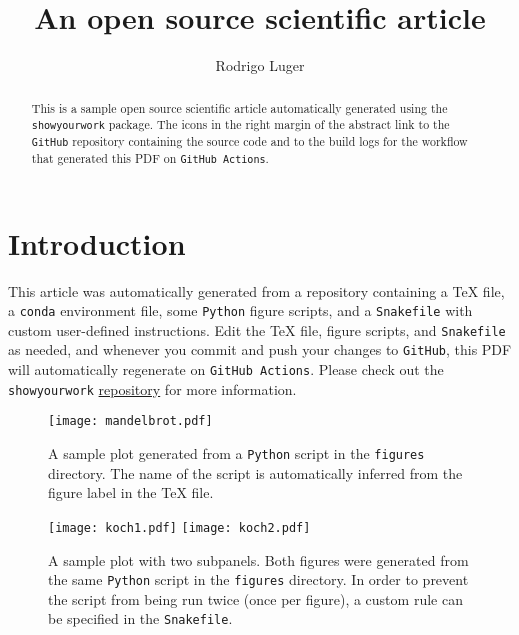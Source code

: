 \documentclass[twocolumn]{aastex631}
\begin{document}
\title{An open source scientific article}

\author{Rodrigo Luger}

\begin{abstract}
    This is a sample open source scientific article automatically generated using the \texttt{showyourwork} package.
    The icons in the right margin of the abstract link to the \texttt{GitHub} repository containing the source code and to the build logs for the workflow that generated this PDF on \texttt{GitHub Actions}.
\end{abstract}

\section{Introduction}
This article was automatically generated from a repository containing a TeX file,
a \texttt{conda} environment file, some \texttt{Python} figure scripts, and a \texttt{Snakefile} with custom user-defined instructions.
Edit the TeX file, figure scripts, and \texttt{Snakefile} as needed, and whenever you commit and push your changes to \texttt{GitHub}, this PDF will automatically regenerate on \texttt{GitHub Actions}. Please check out the \texttt{showyourwork} \href{https://github.com/rodluger/showyourwork}{repository} for more information.

\begin{figure}[ht!]
    \begin{centering}
        \texttt{[image: mandelbrot.pdf]}
        \caption{
            A sample plot generated from a \texttt{Python} script in the \texttt{figures} directory.
            The name of the script is automatically inferred from the figure label in the TeX file.
        }
        \label{fig:mandelbrot}
    \end{centering}
\end{figure}

\begin{figure}[ht!]
    \begin{centering}
        \texttt{[image: koch1.pdf]}
        \texttt{[image: koch2.pdf]}
        \caption{
            A sample plot with two subpanels.
            Both figures were generated from the same \texttt{Python} script in the \texttt{figures} directory.
            In order to prevent the script from being run twice (once per figure), a custom rule can be
            specified in the \texttt{Snakefile}.
        }
        \label{fig:koch}
    \end{centering}
\end{figure}
\end{document}

